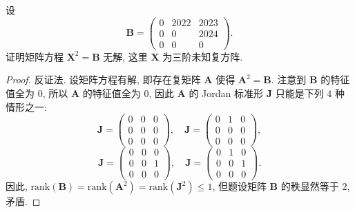 \documentclass[../../main.tex]{subfiles}
\begin{document}
\begin{example}
设
\[
\boldsymbol{B} = \begin{pmatrix} 0 & 2022 & 2023 \\ 0 & 0 & 2024 \\ 0 & 0 & 0 \end{pmatrix}.
\]
证明矩阵方程 \( \boldsymbol{X}^2 = \boldsymbol{B} \) 无解, 这里 \( \boldsymbol{X} \) 为三阶未知复方阵.
\end{example}
\begin{proof}
反证法. 设矩阵方程有解, 即存在复矩阵 \( \boldsymbol{A} \) 使得 \( \boldsymbol{A}^2 = \boldsymbol{B} \). 注意到 \( \boldsymbol{B} \) 的特征值全为 \( 0 \), 所以 \( \boldsymbol{A} \) 的特征值全为 \( 0 \), 因此 \( \boldsymbol{A} \) 的 Jordan 标准形 \( \boldsymbol{J} \) 只能是下列 \( 4 \) 种情形之一:
\[
\boldsymbol{J} = \begin{pmatrix} 0 & 0 & 0 \\ 0 & 0 & 0 \\ 0 & 0 & 0 \end{pmatrix}, \quad \boldsymbol{J} = \begin{pmatrix} 0 & 1 & 0 \\ 0 & 0 & 0 \\ 0 & 0 & 0 \end{pmatrix},
\]
\[
\boldsymbol{J} = \begin{pmatrix} 0 & 0 & 0 \\ 0 & 0 & 1 \\ 0 & 0 & 0 \end{pmatrix}, \quad \boldsymbol{J} = \begin{pmatrix} 0 & 1 & 0 \\ 0 & 0 & 1 \\ 0 & 0 & 0 \end{pmatrix}.
\]
因此, \( \mathrm{rank}(\boldsymbol{B}) = \mathrm{rank}(\boldsymbol{A}^2) = \mathrm{rank}(\boldsymbol{J}^2) \leqslant 1 \), 但题设矩阵 \( \boldsymbol{B} \) 的秩显然等于 \( 2 \), 矛盾.
\end{proof}
\end{document}
